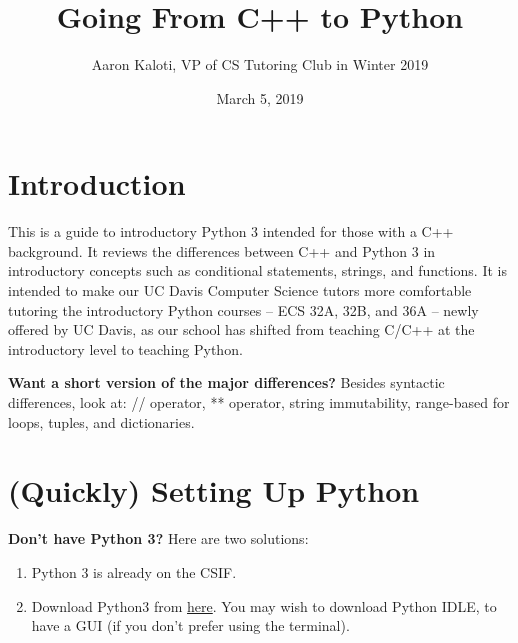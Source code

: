 \documentclass{article}
\title{Going From C++ to Python}
\author{Aaron Kaloti, VP of CS Tutoring Club in Winter 2019}
\date{March 5, 2019}
\begin{document}
\maketitle
\tableofcontents

\section{Introduction}

This is a guide to introductory Python 3 intended for those with a C++ background. It reviews the differences between C++ and Python 3 in introductory concepts such as conditional statements, strings, and functions. It is intended to make our UC Davis Computer Science tutors more comfortable tutoring the introductory Python courses -- ECS 32A, 32B, and 36A -- newly offered by UC Davis, as our school has shifted from teaching C/C++ at the introductory level to teaching Python.

\textbf{Want a short version of the major differences?} Besides syntactic differences, look at: // operator, ** operator, string immutability, range-based for loops, tuples, and dictionaries.

\section{(Quickly) Setting Up Python}
\textbf{Don't have Python 3?} Here are two solutions:
\begin{enumerate}
    \item Python 3 is already on the CSIF.
    \item Download Python3 from \href{https://www.python.org/downloads/}{here}. You may wish to download Python IDLE, to have a GUI (if you don't prefer using the terminal).
\end{enumerate}
\end{document}
